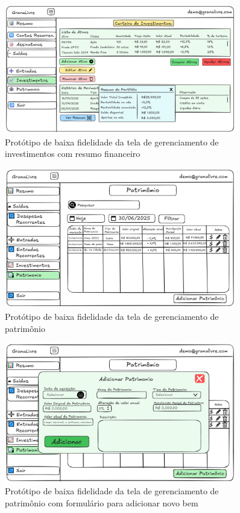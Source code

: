 \begin{figure}[H]
    \centering
    \includegraphics[width=0.9\textwidth]{imgs/08-investimentos_1.png}
    \caption{Protótipo de baixa fidelidade da tela de gerenciamento de investimentos com resumo financeiro}
    \label{fig:prot_investimentos2}
\end{figure}

\begin{figure}[H]
    \centering
    \includegraphics[width=0.9\textwidth]{imgs/09-patrimonio.png}
    \caption{Protótipo de baixa fidelidade da tela de gerenciamento de patrimônio}
    \label{fig:prot_patrimonio}
\end{figure}

\begin{figure}[H]
    \centering
    \includegraphics[width=0.9\textwidth]{imgs/09-patrimonio2.png}
    \caption{Protótipo de baixa fidelidade da tela de gerenciamento de patrimônio com formulário para adicionar novo bem}
    \label{fig:prot_patrimonio2}
\end{figure}

